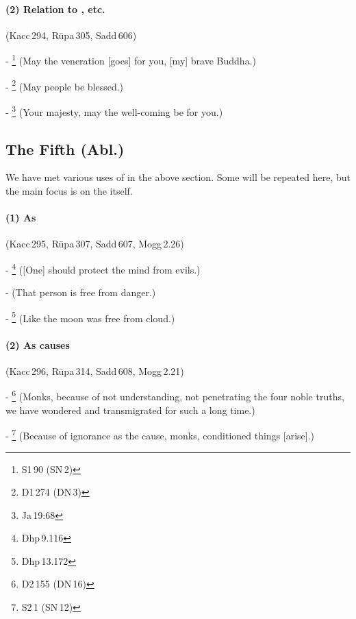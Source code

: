 \paragraph*{(2) Relation to , etc.} (Kacc\,294, R\=upa\,305, Sadd\,606)\par
- \footnote{S1\,90 (SN\,2)} (May the veneration [goes] for you, [my] brave Buddha.)\par
- \footnote{D1\,274 (DN\,3)} (May people be blessed.)\par
- \footnote{Ja\,19:68} (Your majesty, may the well-coming be for you.)\par

{}
\subsection*{The Fifth  (Abl.)}

We have met various uses of  in the above section. Some will be repeated here, but the main focus is on the  itself.

\paragraph*{(1) As } (Kacc\,295, R\=upa\,307, Sadd\,607, Mogg\,2.26)\par
- \footnote{Dhp\,9.116} ([One] should protect the mind from evils.)\par
-  (That person is free from danger.)\par
- \footnote{Dhp\,13.172} (Like the moon was free from cloud.)\par

\paragraph*{(2) As causes} (Kacc\,296, R\=upa\,314, Sadd\,608, Mogg\,2.21)\par
- \footnote{D2\,155 (DN\,16)} (Monks, because of not understanding, not penetrating the four noble truths, we have wondered and transmigrated for such a long time.)\par
- \footnote{S2\,1 (SN\,12)} (Because of ignorance as the cause, monks, conditioned things [arise].)\par

